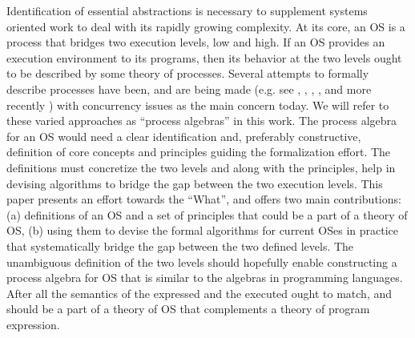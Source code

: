 \documentclass[draft]{article}
\begin{document}
Identification  of essential abstractions  is necessary  to supplement
systems oriented work to deal with its rapidly growing complexity.  At
its core,  an OS is a  process that bridges two  execution levels, low
and high.  If an OS provides an execution environment to its programs,
then its  behavior at  the two  levels ought to  be described  by some
theory of processes.  Several  attempts to formally describe processes
have     been,      and     are     being      made     (e.g.      see
\cite{Milner:1982:CCS:539036},         \cite{Brookes:1984:TCS:828.833},
\cite{bergstra:pa},  \cite{VanHorn:2010:AAM:1932681.1863553}, and more
recently   \cite{Nielson:2012:FLP:2071389.2071392})  with  concurrency
issues  as the  main concern  today.  We  will refer  to  these varied
approaches as ``process algebras''  in this work.  The process algebra
for  an   OS  would  need  a  clear   identification  and,  preferably
constructive, definition  of core concepts and  principles guiding the
formalization effort.  The definitions  must concretize the two levels
and along with  the principles, help in devising  algorithms to bridge
the  gap between  the two  execution levels.   This paper  presents an
effort towards  the ``What'', and  offers two main  contributions: (a)
definitions of an OS and a set of principles that could be a part of a
theory  of OS,  (b) using  them to  devise the  formal  algorithms for
current OSes  in practice that  systematically bridge the  gap between
the two defined levels.  The  unambiguous definition of the two levels
should hopefully enable constructing a  process algebra for OS that is
similar  to the  algebras  in programming  languages.   After all  the
semantics of the expressed and the executed ought to match, and should
be  a part of  a theory  of OS  that complements  a theory  of program
expression.
\end{document}
